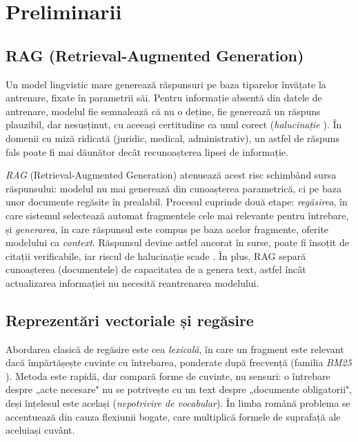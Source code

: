 \chapter{Preliminarii}

\section{RAG (Retrieval-Augmented Generation)}

Un model lingvistic mare generează răspunsuri pe baza tiparelor învățate la antrenare, fixate în parametrii săi. Pentru informație absentă din datele de antrenare, modelul fie semnalează că nu o deține, fie generează un răspuns plauzibil, dar nesusținut, cu aceeași certitudine ca unul corect (\emph{halucinație} \cite{ji2023hallucination}). În domenii cu miză ridicată (juridic, medical, administrativ), un astfel de răspuns fals poate fi mai dăunător decât recunoașterea lipsei de informație.

\emph{RAG} (Retrieval-Augmented Generation) \cite{lewis2020retrieval} atenuează acest risc schimbând sursa răspunsului: modelul nu mai generează din cunoașterea parametrică, ci pe baza unor documente regăsite în prealabil. Procesul cuprinde două etape: \emph{regăsirea}, în care sistemul selectează automat fragmentele cele mai relevante pentru întrebare, și \emph{generarea}, în care răspunsul este compus pe baza acelor fragmente, oferite modelului ca \emph{context}. Răspunsul devine astfel ancorat în surse, poate fi însoțit de citații verificabile, iar riscul de halucinație scade \cite{gao2023retrieval}. În plus, RAG separă cunoașterea (documentele) de capacitatea de a genera text, astfel încât actualizarea informației nu necesită reantrenarea modelului.

\section{Reprezentări vectoriale și regăsire}

Abordarea clasică de regăsire este cea \emph{lexicală}, în care un fragment este relevant dacă împărtășește cuvinte cu întrebarea, ponderate după frecvență (familia \emph{BM25} \cite{robertson2009bm25}). Metoda este rapidă, dar compară forme de cuvinte, nu sensuri: o întrebare despre „acte necesare" nu se potrivește cu un text despre „documente obligatorii", deși înțelesul este același (\emph{nepotrivire de vocabular}). În limba română problema se accentuează din cauza flexiunii bogate, care multiplică formele de suprafață ale aceluiași cuvânt.

